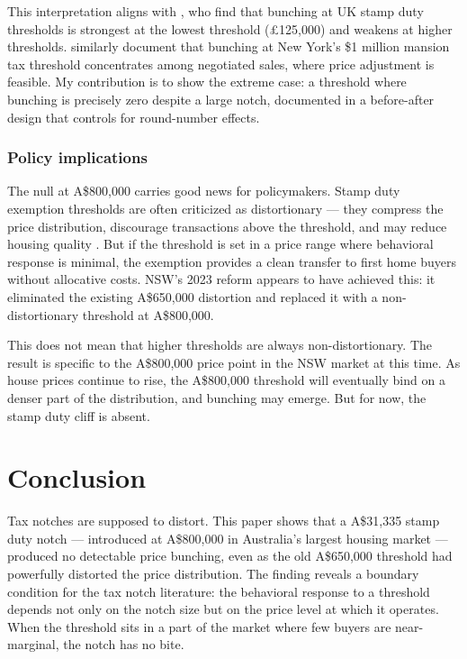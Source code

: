 \documentclass[12pt]{article}
\begin{document}
This interpretation aligns with \citet{best2018}, who find that bunching at UK stamp duty thresholds is strongest at the lowest threshold (\pounds125,000) and weakens at higher thresholds. \citet{kopczuk2016} similarly document that bunching at New York's \$1 million mansion tax threshold concentrates among negotiated sales, where price adjustment is feasible. My contribution is to show the extreme case: a threshold where bunching is precisely zero despite a large notch, documented in a before-after design that controls for round-number effects.

\subsubsection*{Policy implications} The null at A\$800,000 carries good news for policymakers. Stamp duty exemption thresholds are often criticized as distortionary --- they compress the price distribution, discourage transactions above the threshold, and may reduce housing quality \citep{hilber2017,davidoff2016}. But if the threshold is set in a price range where behavioral response is minimal, the exemption provides a clean transfer to first home buyers without allocative costs. NSW's 2023 reform appears to have achieved this: it eliminated the existing A\$650,000 distortion and replaced it with a non-distortionary threshold at A\$800,000.

This does not mean that higher thresholds are always non-distortionary. The result is specific to the A\$800,000 price point in the NSW market at this time. As house prices continue to rise, the A\$800,000 threshold will eventually bind on a denser part of the distribution, and bunching may emerge. But for now, the stamp duty cliff is absent.

\section{Conclusion}

Tax notches are supposed to distort. This paper shows that a A\$31,335 stamp duty notch --- introduced at A\$800,000 in Australia's largest housing market --- produced no detectable price bunching, even as the old A\$650,000 threshold had powerfully distorted the price distribution. The finding reveals a boundary condition for the tax notch literature: the behavioral response to a threshold depends not only on the notch size but on the price level at which it operates. When the threshold sits in a part of the market where few buyers are near-marginal, the notch has no bite.
\end{document}
